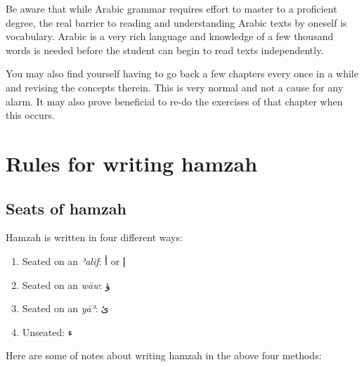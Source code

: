 \documentclass[
  10pt,
]{book}
\providecommand{\tightlist}{%
  \setlength{\itemsep}{0pt}\setlength{\parskip}{0pt}}
\begin{document}
Be aware that while Arabic grammar requires effort to master to a proficient degree, the real barrier to reading and understanding Arabic texts by oneself is vocabulary. Arabic is a very rich language and knowledge of a few thousand words is needed before the student can begin to read texts independently.

You may also find yourself having to go back a few chapters every once in a while and revising the concepts therein. This is very normal and not a cause for any alarm. It may also prove beneficial to re-do the exercises of that chapter when this occurs.

\appendix


\chapter{Rules for writing hamzah}\label{hamzarules}

\section{Seats of hamzah}\label{seats-of-hamzah}

Hamzah is written in four different ways:

\begin{enumerate}
\def\labelenumi{\arabic{enumi}.}
\tightlist
\item
  Seated on an \emph{ʾalif}: \foreignlanguage{arabic}{أ} or \foreignlanguage{arabic}{إ}
\item
  Seated on an \emph{wāw}: \foreignlanguage{arabic}{ؤ}
\item
  Seated on an \emph{yāʾ}: \foreignlanguage{arabic}{ئ}
\item
  Unseated: \foreignlanguage{arabic}{ء}
\end{enumerate}

Here are some of notes about writing hamzah in the above four methods:
\end{document}
